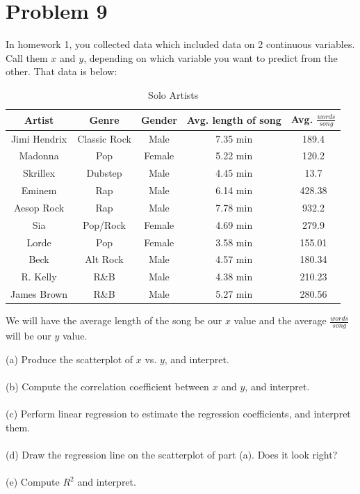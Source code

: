 \documentclass{article}
\begin{document}
\section*{Problem 9} %

	In homework 1, you collected data which included data on 2 continuous variables. Call them $x
	$ and $y$, depending on which variable you want to predict from the other. That data is below:
	
	\begin{table}[!htb]
	\centering
	\begin{tabular}{ | c || c | c | c | c | } \hline
		Artist & Genre & Gender & Avg. length of song & Avg. $\frac{words}{song}$ \\ \hline \hline
		Jimi Hendrix & Classic Rock & Male & 7.35 min & 189.4 \\ \hline %
		Madonna & Pop & Female & 5.22 min & 120.2 \\ \hline %
		Skrillex & Dubstep & Male & 4.45 min & 13.7 \\ \hline %
		Eminem & Rap & Male & 6.14 min & 428.38 \\ \hline %
		Aesop Rock & Rap & Male & 7.78 min & 932.2 \\ \hline %
		Sia & Pop/Rock & Female & 4.69 min & 279.9 \\ \hline %
		Lorde & Pop & Female & 3.58 min & 155.01 \\ \hline %
		Beck & Alt Rock & Male & 4.57 min & 180.34 \\ \hline %
		R. Kelly & R\&B & Male & 4.38 min & 210.23 \\ \hline %
		James Brown & R\&B & Male & 5.27 min & 280.56 \\ \hline %
	\end{tabular}
	\caption{Solo Artists}
	\label{tab:solo_artists}
	\end{table}
	
	We will have the average length of the song be our $x$ value and the average $\frac{words}
	{song}$ will be our $y$ value.
	
	(a) Produce the scatterplot of $x$ vs. $y$, and interpret. \\ \\
	(b) Compute the correlation coefficient between $x$ and $y$, and interpret. \\ \\
	(c) Perform linear regression to estimate the regression coefficients, and interpret them. \\ \\
	(d) Draw the regression line on the scatterplot of part (a). Does it look right? \\ \\
	(e) Compute $R^2$ and interpret.
	
\end{document}
